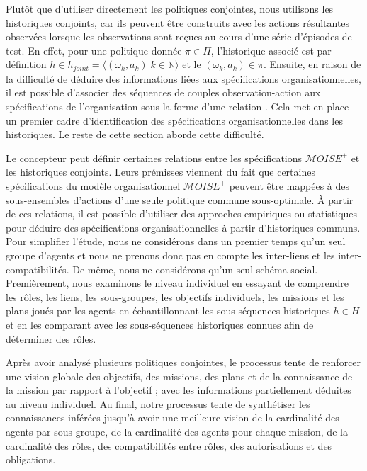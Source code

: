 \documentclass[contribution]{jfsma}
\newcounter{relation}
\begin{document}
Plutôt que d'utiliser directement les politiques conjointes, nous utilisons les historiques conjoints, car ils peuvent être construits avec les actions résultantes observées lorsque les observations sont reçues au cours d'une série d'épisodes de test. En effet, pour une politique donnée $\pi \in \Pi$, l'historique associé est par définition $h \in h_{joint} = \langle(\omega_k,a_k) | k \in \mathbb{N}\rangle$ et le $(\omega_k,a_k) \in \pi$.
Ensuite, en raison de la difficulté de déduire des informations liées aux spécifications organisationnelles, il est possible d'associer des séquences de couples observation-action aux spécifications de l'organisation sous la forme d'une relation . Cela met en place un premier cadre d’identification des spécifications organisationnelles dans les historiques. Le reste de cette section aborde cette difficulté.

Le concepteur peut définir certaines relations entre les spécifications $\mathcal{M}OISE^+$ et les historiques conjoints. Leurs prémisses viennent du fait que certaines spécifications du modèle organisationnel $\mathcal{M}OISE^+$ peuvent être mappées à des sous-ensembles d'actions d'une seule politique commune sous-optimale.
À partir de ces relations, il est possible d’utiliser des approches empiriques ou statistiques pour déduire des spécifications organisationnelles à partir d’historiques communs.
Pour simplifier l'étude, nous ne considérons dans un premier temps qu'un seul groupe d'agents et nous ne prenons donc pas en compte les inter-liens et les inter-compatibilités. De même, nous ne considérons qu’un seul schéma social.
Premièrement, nous examinons le niveau individuel en essayant de comprendre les rôles, les liens, les sous-groupes, les objectifs individuels, les missions et les plans joués par les agents en échantillonnant les sous-séquences historiques $h \in H$ et en les comparant avec les sous-séquences historiques connues afin de déterminer des rôles.

Après avoir analysé plusieurs politiques conjointes, le processus tente de renforcer une vision globale des objectifs, des missions, des plans et de la connaissance de la mission par rapport à l'objectif ; avec les informations partiellement déduites au niveau individuel.
Au final, notre processus tente de synthétiser les connaissances inférées jusqu'à avoir une meilleure vision de la cardinalité des agents par sous-groupe, de la cardinalité des agents pour chaque mission, de la cardinalité des rôles, des compatibilités entre rôles, des autorisations et des obligations.
\end{document}
